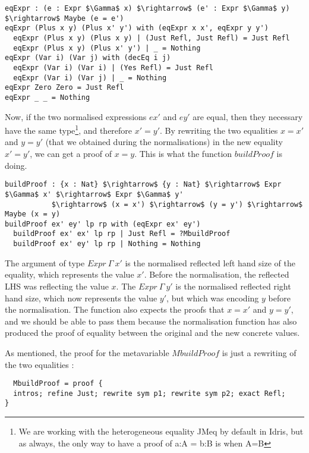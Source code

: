 \begin{lstlisting}
eqExpr : (e : Expr $\Gamma$ x) $\rightarrow$ (e' : Expr $\Gamma$ y) $\rightarrow$ Maybe (e = e')
eqExpr (Plus x y) (Plus x' y') with (eqExpr x x', eqExpr y y')
  eqExpr (Plus x y) (Plus x y) | (Just Refl, Just Refl) = Just Refl
  eqExpr (Plus x y) (Plus x' y') | _ = Nothing
eqExpr (Var i) (Var j) with (decEq i j)
  eqExpr (Var i) (Var i) | (Yes Refl) = Just Refl
  eqExpr (Var i) (Var j) | _ = Nothing
eqExpr Zero Zero = Just Refl
eqExpr _ _ = Nothing
\end{lstlisting}



Now, if the two normalised expressions $ex'$ and $ey'$ are equal, then they necessary have the same type\footnote{We are working with the heterogeneous equality JMeq by default in Idris, but as always, the only way to have a proof of a:A = b:B is when A=B}, and therefore $x'=y'$.
By rewriting the two equalities $x=x'$ and $y=y'$ (that we obtained during the normalisations) in the new equality $x'=y'$, we can get a proof of $x=y$. This is what the function $buildProof$ is doing.

\begin{lstlisting}
buildProof : {x : Nat} $\rightarrow$ {y : Nat} $\rightarrow$ Expr $\Gamma$ x' $\rightarrow$ Expr $\Gamma$ y' 
           $\rightarrow$ (x = x') $\rightarrow$ (y = y') $\rightarrow$ Maybe (x = y)
buildProof ex' ey' lp rp with (eqExpr ex' ey')
  buildProof ex' ex' lp rp | Just Refl = ?MbuildProof
  buildProof ex' ey' lp rp | Nothing = Nothing
\end{lstlisting}


The argument of type $Expr\ \Gamma\ x'$ is the normalised reflected left hand size of the equality, which represents the value $x'$. Before the normalisation, the reflected LHS was reflecting the value $x$. The $Expr\ \Gamma\ y'$ is the normalised reflected right hand size, which now represents the value $y'$, but which was encoding $y$ before the normalisation. The function also expects the proofs that $x=x'$ and $y=y'$, and we should be able to pass them because the normalisation function has also produced the proof of equality between the original and the new concrete values.

As mentioned, the proof for the metavariable $MbuildProof$ is just a rewriting of the two equalities :


\begin{lstlisting}
  MbuildProof = proof {
  intros; refine Just; rewrite sym p1; rewrite sym p2; exact Refl;
}  
\end{lstlisting}


